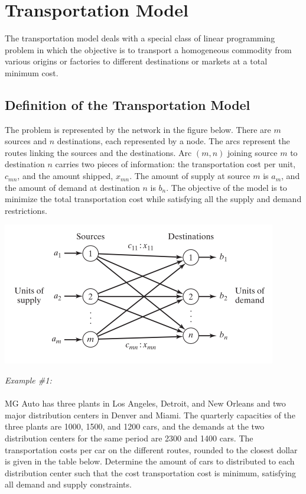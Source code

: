 \section{Transportation Model}
The transportation model deals with a special class of linear programming problem in which the objective is to transport a homogeneous commodity from various origins or factories to different destinations or markets at a total minimum cost.
%
\subsection{Definition of the Transportation Model}
The problem is represented by the network in the figure below. There are $ m $ sources and $ n $ destinations, each represented by a node. The arcs represent the routes linking the sources and the destinations. Arc $ (m, n) $ joining source $ m $ to destination $ n $ carries two pieces of information: the transportation cost per unit, $ c_{mn} $, and the amount shipped, $ x_{mn} $. The amount of supply at source $ m $ is $ a_m $, and the amount of demand at destination $ n $ is $ b_n $. The objective of the model is to minimize the total transportation cost while satisfying all the supply and demand restrictions.
\begin{center}
	\includegraphics{gfx/fig53.png}
\end{center}
\textit{Example \#1:}\\\\
MG Auto has three plants in Los Angeles, Detroit, and New Orleans and two major distribution centers in Denver and Miami. The quarterly capacities of the three plants are 1000, 1500, and 1200 cars, and the demands at the two distribution centers for the same period are 2300 and 1400 cars. The transportation costs per car on the different routes, rounded to the closest dollar is given in the table below. Determine the amount of cars to distributed to each distribution center such that the cost transportation cost is minimum, satisfying all demand and supply constraints.

